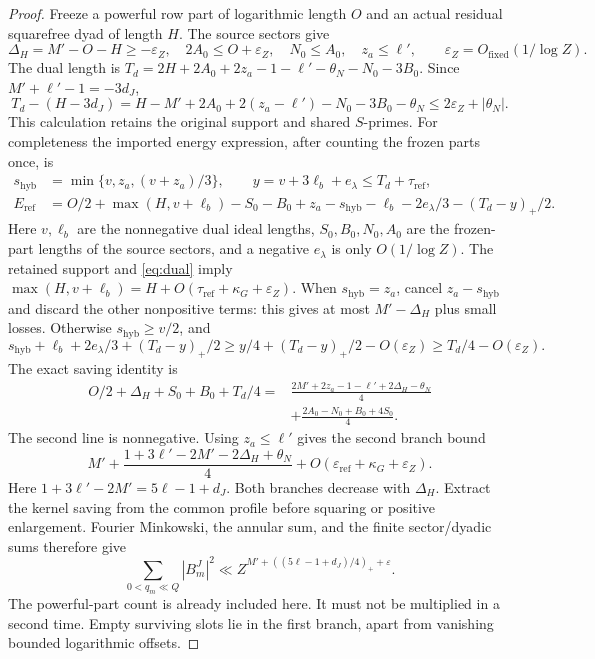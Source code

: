 \documentclass[11pt,a4paper]{article}
\theoremstyle{definition}
\newcommand{\eps}{\varepsilon}
\newcommand{\pos}[1]{\left(#1\right)_+}
\begin{document}
\begin{proof}
Freeze a powerful row part of logarithmic length $O$ and an actual
residual squarefree dyad of length $H$. The source sectors give
\[
 \Delta_H=M'-O-H\ge-\eps_Z,\quad
 2A_0\le O+\eps_Z,\quad N_0\le A_0,\quad z_a\le\ell',
 \qquad \eps_Z=O_{\mathrm{fixed}}(1/\log Z).
\]
The dual length is
$T_d=2H+2A_0+2z_a-1-\ell'-\theta_N-N_0-3B_0$.
Since $M'+\ell'-1=-3d_J$,
\begin{equation}\label{eq:dual}
 T_d-(H-3d_J)
 =H-M'+2A_0+2(z_a-\ell')-N_0-3B_0-\theta_N
 \le2\eps_Z+|\theta_N|.
\end{equation}
This calculation retains the original support and shared $S$-primes.
For completeness the imported energy expression, after counting
the frozen parts once, is
\[
\begin{split}
 s_{\mathrm{hyb}}&=\min\{v,z_a,(v+z_a)/3\},\qquad
 y=v+3\ell_b+e_\lambda\le T_d+\tau_{\mathrm{ref}},\\
 E_{\mathrm{ref}}&=O/2+\max(H,v+\ell_b)-S_0-B_0+z_a
 -s_{\mathrm{hyb}}-\ell_b-2e_\lambda/3-(T_d-y)_+/2 .
\end{split}
\]
Here $v,\ell_b$ are the nonnegative dual ideal lengths,
$S_0,B_0,N_0,A_0$ are the frozen-part lengths of the source sectors,
and a negative $e_\lambda$ is only $O(1/\log Z)$.
The retained support and \eqref{eq:dual} imply
$\max(H,v+\ell_b)=H+O(\tau_{\mathrm{ref}}+\kappa_G+\eps_Z)$.
When $s_{\mathrm{hyb}}=z_a$, cancel $z_a-s_{\mathrm{hyb}}$ and
discard the other nonpositive terms: this gives at most
$M'-\Delta_H$ plus small losses.
Otherwise $s_{\mathrm{hyb}}\ge v/2$, and
\[
 s_{\mathrm{hyb}}+\ell_b+2e_\lambda/3+(T_d-y)_+/2
 \ge y/4+(T_d-y)_+/2-O(\eps_Z)\ge T_d/4-O(\eps_Z).
\]
The exact saving identity is
\[
\begin{split}
 O/2+\Delta_H+S_0+B_0+T_d/4
 ={}&\frac{2M'+2z_a-1-\ell'+2\Delta_H-\theta_N}{4}\\
 &+\frac{2A_0-N_0+B_0+4S_0}{4}.
\end{split}
\]
The second line is nonnegative. Using $z_a\le\ell'$ gives the
second branch bound
\[
 M'+\frac{1+3\ell'-2M'-2\Delta_H+\theta_N}{4}
       +O(\eps_{\mathrm{ref}}+\kappa_G+\eps_Z).
\]
Here $1+3\ell'-2M'=5\ell-1+d_J$.
Both branches decrease with $\Delta_H$. Extract the kernel saving
from the common profile before squaring or positive enlargement.
Fourier Minkowski, the annular sum, and the finite sector/dyadic sums
therefore give
\begin{equation}\label{eq:Benergy}
 \sum_{0<q_m\ll Q}|B_m^J|^2
 \ll Z^{M'+\pos{(5\ell-1+d_J)/4}+\eps}.
\end{equation}
The powerful-part count is already included here. It must not be
multiplied in a second time. Empty surviving slots lie in the first
branch, apart from vanishing bounded logarithmic offsets.


\end{proof}
\end{document}
